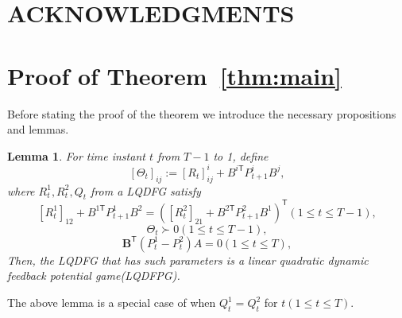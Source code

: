\documentclass[letterpaper, 10 pt, conference]{ieeeconf}  %
\newcommand{\transpose}{\mathsf{T}}
\newtheorem{lemma}{Lemma}
\begin{document}
\section{ACKNOWLEDGMENTS}






\appendix
\section{Proof of Theorem~\ref{thm:main}}
Before stating the proof of the theorem we introduce the necessary propositions and lemmas.

\begin{lemma}
    For time instant $t$ from $T-1$ to 1, define
        \begin{equation}\label{eq:Theta}
        [\Theta_{t}]_{ij} := [R_{t}]^{i}_{ij} + B^{i\transpose}P_{t+1}^{i}B^{j},
        \end{equation}
    where $R_{t}^{1},R_{t}^{2},Q_{t}$ from a LQDFG satisfy
        \begin{equation}\label{eq:costFPDG1}
            [R_{t}^{1}]_{12} + B^{1\transpose}P_{t+1}^{1}B^{2} = ([R_{t}^{2}]_{21} + B^{2\transpose}P_{t+1}^{2}B^{1})^{\transpose}(1\leq t\leq T-1),
        \end{equation}
        \begin{equation}\label{eq:costFPDG2}
            \Theta_{t} \succ 0(1\leq t \leq T-1),
        \end{equation}
        \begin{equation}\label{eq:costFPDG3}
            \mathbf{B}^{\transpose}(P_{t}^{1}-P_{t}^{2})A=0(1\leq t \leq T),
        \end{equation}
    Then, the LQDFG that has such parameters is a linear quadratic dynamic feedback potential game(LQDFPG).
\end{lemma}
The above lemma is a special case of \cite[Theorem 6]{prasad_structure_2023} when $Q_{t}^{1}=Q_{t}^{2}$ for $t(1\leq t \leq T)$.
\end{document}
